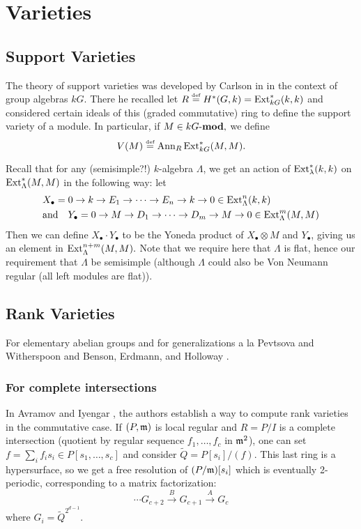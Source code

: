 \documentclass[12pt]{article}
\begin{document}
\section{Varieties}

\subsection{Support Varieties}
The theory of support varieties was developed by Carlson in \cite{carlson83} in the context of group algebras $kG$. There he recalled let $R\stackrel{\text{\tiny def}}{=} H^\ast(G,k)=\operatorname{Ext}^\ast_{kG}(k,k)$ and considered certain ideals of this (graded commutative) ring to define the support variety of a module. In particular, if $M\in kG\text{-}\mathbf{mod},$ we define
\[V(M)\stackrel{\text{\tiny def}}{=} \operatorname{Ann}_R{\operatorname{Ext}_{kG}^\ast(M,M)}.\]
\begin{rmk}
    Recall that for any (semisimple?!) $k$-algebra $\Lambda$, we get an action of $\operatorname{Ext}_\lambda^\ast(k,k)$ on $\operatorname{Ext}_\Lambda^\ast(M,M)$ in the following way: let
    \begin{align*}
        &X_\bullet = 0\to k\to E_1\to \cdots\to E_n\to k\to 0\in \operatorname{Ext}^n_\Lambda(k,k)\\
        &\text{and}\quad Y_\bullet=0\to M\to D_1\to\cdots\to D_m\to M\to 0\in\operatorname{Ext}_\Lambda^m(M,M)
    \end{align*}
    Then we can define $X_\bullet\cdot Y_\bullet$ to be the Yoneda product of $X_\bullet\otimes M$ and $Y_\bullet$, giving us an element in $\operatorname{Ext}^{n+m}_\Lambda(M,M).$ Note that we require here that $\Lambda$ is flat, hence our requirement that $\Lambda$ be semisimple (although $\Lambda$ could also be Von Neumann regular (all left modules are flat)).
\end{rmk}

\subsection{Rank Varieties}
For elementary abelian groups and for generalizations a la Pevtsova and Witherspoon \cite{pevtsova-witherspoon09} and Benson, Erdmann, and Holloway \cite{benson-erdmann-holloway07}.

\subsubsection{For complete intersections}
In Avramov and Iyengar \cite[\S 4.3]{avramov-iyengar}, the authors establish a way to compute rank varieties in the commutative case. If $(P,\mathfrak{m})$ is local regular and $R=P/I$ is a complete intersection (quotient by regular sequence $f_1,\dots,f_c$ in $\mathfrak{m}^2$), one can set $f=\sum_if_is_i\in P[s_1,\dots,s_c]$ and consider $\tilde Q=P[s_i]/(f).$ This last ring is a hypersurface, so we get a free resolution of $(P/\mathfrak{m})[s_i]$ which is eventually 2-periodic, corresponding to a matrix factorization:
\[\cdots G_{c+2}\xrightarrow{B}G_{c+1}\xrightarrow{A}G_c\]
where $G_i=\tilde Q^{2^{d-1}}$.
\end{document}
